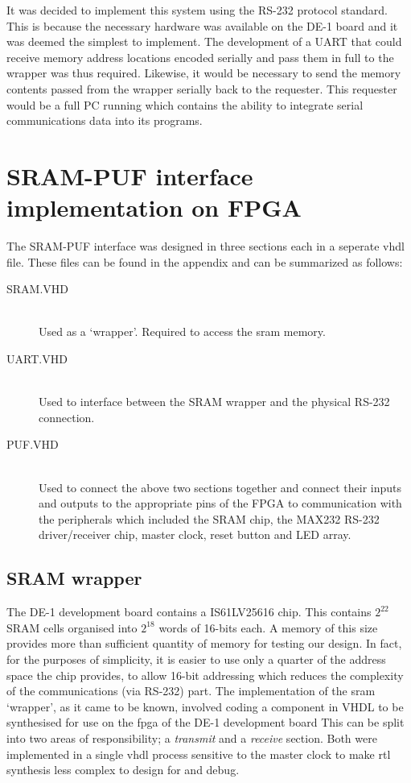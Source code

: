 It was decided to implement this system using the RS-232 protocol standard.
This is because the necessary hardware was available on the DE-1 board and it was
deemed the simplest to implement.
The development of a UART that could receive memory address locations encoded
serially and pass them in full to the wrapper was thus required.
Likewise, it would be necessary to send the memory contents passed from the
wrapper serially back to the requester.
This requester would be a full PC running \matlab which contains
the ability to integrate serial communications data into its programs.

\section{SRAM-PUF interface implementation on FPGA}

The SRAM-PUF interface was designed in three sections each in a seperate \gls{vhdl} file.
These files can be found in the appendix and can be summarized as follows:
\begin{description}
\item[SRAM.VHD] \hfill \\
  Used as a `wrapper'. Required to access the \gls{sram} memory.
\item[UART.VHD] \hfill \\
  Used to interface between the SRAM wrapper and the physical RS-232 connection.
\item[PUF.VHD] \hfill \\
  Used to connect the above two sections together and connect their inputs and outputs
  to the appropriate pins of the FPGA to communication with the peripherals which included
  the SRAM chip, the MAX232 RS-232 driver/receiver chip, master clock, reset button and
  LED array.
\end{description}

\subsection{SRAM wrapper}

The DE-1 development board contains a IS61LV25616 chip. This contains
$2^{22}$ SRAM cells organised into $2^{18}$ words of 16-bits each. A memory of this size
provides more than sufficient quantity of memory for testing our design.
In fact, for the purposes of simplicity, it is easier to use only a quarter
of the address space the chip provides, to allow 16-bit addressing which
reduces the complexity of the communications (via RS-232) part.
The implementation of the \gls{sram} `wrapper', as it came to be known, involved coding a
component in VHDL to be synthesised for use on the \gls{fpga} of the DE-1 development board
This can be split into two areas of responsibility; a \emph{transmit} and a \emph{receive}
section. Both were implemented in a single \gls{vhdl} process sensitive to the master
clock to make \gls{rtl} synthesis less complex to design for and debug.

